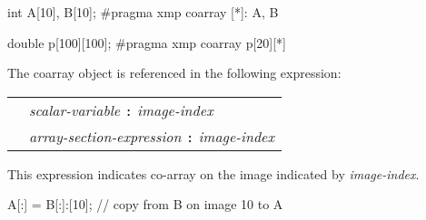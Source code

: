 \hspace{\hsize}
\begin{Cexample}
int A[10], B[10];
#pragma xmp coarray [*]: A, B

double p[100][100];
#pragma xmp coarray p[20][*]
\end{Cexample}

The coarray object is referenced in the following expression:

\begin{tabular}{ll}
\hspace{0.5cm} & {\it scalar-variable} {\tt :} {\it image-index} \\
 & {\it array-section-expression} {\tt :} {\it image-index} \\
\end{tabular}

This expression indicates co-array on the image indicated by {\it image-index}.

\hspace{\hsize}
\begin{Cexample}
      A[:] = B[:]:[10];    // copy from B on image 10 to A
\end{Cexample}
